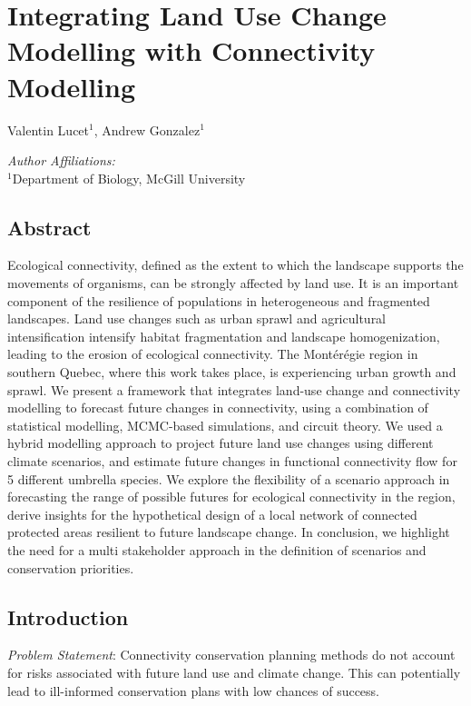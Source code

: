 \chapter{Integrating Land Use Change Modelling with Connectivity Modelling}
\begin{center}
{Valentin Lucet$^{1}$, Andrew Gonzalez$^{1}$}\\
\end{center}
\textit{Author Affiliations:}\\
\normalsize{$^{1}$Department of Biology, McGill University}\\
\section{Abstract}

Ecological connectivity, defined as the extent to which the landscape supports the movements of organisms, can be strongly affected by land use. It is an important component of the resilience of populations in heterogeneous and fragmented landscapes. Land use changes such as urban sprawl and agricultural intensification intensify habitat fragmentation and landscape homogenization, leading to the erosion of ecological connectivity. The Montérégie region in southern Quebec, where this work takes place, is experiencing urban growth and sprawl. We present a framework that integrates land-use change and connectivity modelling to forecast future changes in connectivity, using a combination of statistical modelling, MCMC-based simulations, and circuit theory. We used a hybrid modelling approach to project future land use changes using different climate scenarios, and estimate future changes in functional connectivity flow for 5 different umbrella species. We explore the flexibility of a scenario approach in forecasting the range of possible futures for ecological connectivity in the region, derive insights for the hypothetical design of a local network of connected protected areas resilient to future landscape change. In conclusion, we highlight the need for a multi stakeholder approach in the definition of scenarios and conservation priorities.\\

\section{Introduction}
\vspace{2em}
\textit{Problem Statement}: Connectivity conservation planning methods do not account for risks associated with future land use and climate change. This can potentially lead to ill-informed conservation plans with low chances of success.

